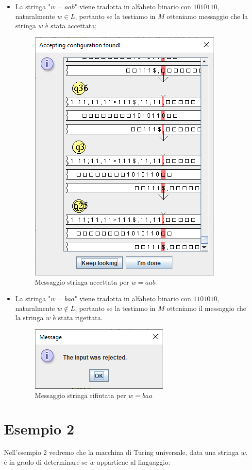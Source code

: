 \documentclass[a4paper,12pt,titlepage,oneside]{book}
\begin{document}
\begin{itemize}
	\item La stringa "$w = aab$" viene tradotta in alfabeto binario con $1010110$, naturalmente $w \in L$, pertanto se la testiamo in $M$ otteniamo messaggio che la stringa $w$ è stata accettata;

	\begin{figure}[!ht]
		\centering
		\includegraphics[width=.3\textwidth]{Images/test_1_linguaggio_1.png}
		\caption{Messaggio stringa accettata per $w = aab$}
		\label{fig:test_1_linguaggio_1}
	\end{figure}	
	
	\item La stringa "$w = baa$" viene tradotta in alfabeto binario con $1101010$, naturalmente $w \not\in L$, pertanto se la testiamo in $M$ otteniamo il messaggio che la stringa $w$ è stata rigettata.
	
	\begin{figure}[!ht]
		\centering
		\includegraphics[width=.4\textwidth]{Images/test_errore_linguaggio.png}
		\caption{Messaggio stringa rifiutata per $w = baa$}
		\label{fig:test_2_errore_linguaggio_1}
	\end{figure}	
	
\end{itemize}	
		
		\section{Esempio 2}

Nell'esempio 2 vedremo che la macchina di Turing universale, data una stringa $w$, è in grado di determinare se $w$ appartiene al linguaggio:
\end{document}
